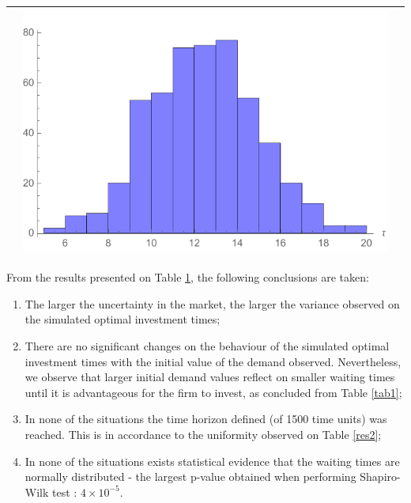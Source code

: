 \begin{table}[!htb]
\begin{tabular}{c|c|c}
\begin{minipage}{.45\textwidth}
		\end{minipage}
		& \begin{minipage}{.45\textwidth}
			\includegraphics[width=\linewidth]{StopTime/3x01o5.pdf}
		\end{minipage} \\ \hline
	\end{tabular}
	\label{hist2}
\end{table}



From the results presented on Table \ref{hist2}, the following conclusions are taken:
\begin{enumerate}
	\item The larger the uncertainty in the market, the larger the variance observed on the simulated optimal investment times;
	
	\item There are no significant changes on the behaviour of the simulated optimal investment times with the initial value of the demand observed. Nevertheless, we observe that larger initial demand values reflect on smaller waiting times until it is advantageous for the firm to invest, as concluded from Table \ref{tab1};
	
	\item In none of the situations the time horizon defined (of 1500 time units) was reached. This is in accordance to the uniformity observed on Table \ref{res2};
	
	\item In none of the situations exists statistical evidence that the waiting times are normally distributed - the largest p-value obtained when performing Shapiro-Wilk test \cite{sw}: $4\times 10^{-5}$.
\end{enumerate}















